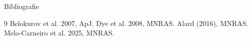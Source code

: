 \documentclass[aspectratio=169]{beamer}
\begin{document}
\begin{frame}[allowframebreaks]{Bibliografie}
  \begin{thebibliography}{9}
     Belokurov et al. 2007, ApJ.
     Dye et al. 2008, MNRAS.
     Alard (2016), MNRAS.
     Melo-Carneiro et al. 2025, MNRAS.
  \end{thebibliography}
\end{frame}
\end{document}
